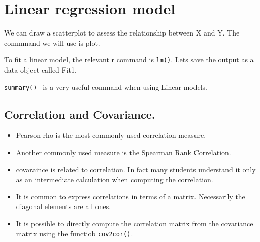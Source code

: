 \section{Linear regression model}

We can draw a scatterplot to assess the relationship between X and Y.
The commmand we will use is plot.

To fit a linear model, the relevant r command is \texttt{lm()}.
Lets save the output as a data object called Fit1.

\texttt{summary() } 
is a very useful command when using Linear models.

\subsection{Correlation and Covariance.}

\begin{itemize}
\item Pearson rho is the most commonly used correlation measure.
\item 
Another commonly used measure is the Spearman Rank Correlation. 
\item 
covaraince is related to correlation. In fact many students understand it only as an intermediate calculation when computing the correlation.
\item 
It is common to express correlations in terms of a matrix. Necessarily the diagonal elements are all ones.
\item 
It is possible to directly compute the correlation matrix from the covariance matrix using the functiob \texttt{cov2cor()}.
\end{itemize}